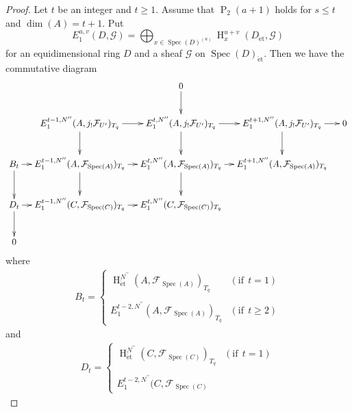 \documentclass{article}
\newcommand{\spec}{\operatorname{Spec}}
\newcommand{\et}{\mathrm{\acute{e}t}}
\newcommand{\HO}{\operatorname{H}}
\begin{document}
\begin{proof}
Let $t$ be an integer and $t\geq 1$.
Assume that $\operatorname{P}_{2}(a+1)$ holds for $s\leq t$
and $\operatorname{dim}(A)=t+1$.
Put
%
\begin{equation*}
E^{u, v}_{1}(D, \mathcal{G})
=
\displaystyle\bigoplus_{x\in \spec(D)^{(u)}}
\HO^{u+v}_{x}(
D_{\et},
\mathcal{G}
)
\end{equation*}
%
for an equidimensional ring $D$ and 
a sheaf $\mathcal{G}$ on $\spec(D)_{\et}$.
Then we have the commutative
diagram
%
%
\begin{equation}
\label{comBD}
\fontsize{9.6pt}{9.6pt}\selectfont
\xymatrix@C=10pt{
&
&
0\ar[d]
&
&
\\
&
E_{1}^{t-1, N^{\prime\prime}}(A, j_{!}\mathcal{F}_{U^{\prime}})_{T_{q}}
\ar[r]\ar[d]
&
E_{1}^{t, N^{\prime\prime}}(A, j_{!}\mathcal{F}_{U^{\prime}})_{T_{q}}
\ar[r]\ar[d]
&
E_{1}^{t+1, N^{\prime\prime}}(A, j_{!}\mathcal{F}_{U^{\prime}})_{T_{q}}
\ar[r]\ar[d]
&
0 \\
B_{t}
\ar[r]\ar[d]
&
E_{1}^{t-1, N^{\prime\prime}}(A, \mathcal{F}_{\spec(A)})_{T_{q}}
\ar[r]\ar[d]
&
E_{1}^{t, N^{\prime\prime}}(A, \mathcal{F}_{\spec(A)})_{T_{q}}
\ar[r]\ar[d]
&
E_{1}^{t+1, N^{\prime\prime}}(A, \mathcal{F}_{\spec(A)})_{T_{q}}
\\
D_{t}
\ar[r]\ar[d]
&
E_{1}^{t-1, N^{\prime\prime}}(C, \mathcal{F}_{\spec(C)})_{T_{q}}
\ar[r]
&
E_{1}^{t, N^{\prime\prime}}(C, \mathcal{F}_{\spec(C)})_{T_{q}}  \\
0
&
}    
\end{equation}
\normalsize
%
where 
%
\begin{align*}
B_{t}=
%
\begin{cases}
\HO^{N^{\prime\prime}}_{\et}(A, 
\mathcal{F}_{\spec(A)})_{T_{q}}
& (\textrm{if}~~t=1) \\
\\
E_{1}^{t-2, N^{\prime\prime}}(A, 
\mathcal{F}_{\spec(A)})_{T_{q}}
& (\textrm{if}~~t\geq 2)
\end{cases}
%
\end{align*}
%
and
%
\begin{align*}
D_{t}=
%
\begin{cases}
\HO^{N^{\prime\prime}}_{\et}(C, 
\mathcal{F}_{\spec(C)})_{T_{q}}
& (\textrm{if}~~t=1) \\
\\
E_{1}^{t-2, N^{\prime\prime}}(C, 
\mathcal{F}_{\spec(C)}

\end{cases}
\end{align*}
\end{proof}
\end{document}
